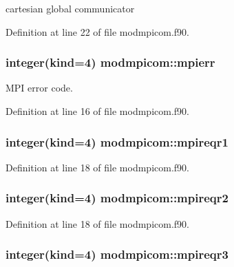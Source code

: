 cartesian global communicator 



Definition at line 22 of file modmpicom.\+f90.

\subsubsection[{\texorpdfstring{mpierr}{mpierr}}]{\setlength{\rightskip}{0pt plus 5cm}integer(kind=4) modmpicom\+::mpierr}\hypertarget{namespacemodmpicom_a500c48035640d6e5b49b1b694372bcd3}{}\label{namespacemodmpicom_a500c48035640d6e5b49b1b694372bcd3}


M\+PI error code. 



Definition at line 16 of file modmpicom.\+f90.

\subsubsection[{\texorpdfstring{mpireqr1}{mpireqr1}}]{\setlength{\rightskip}{0pt plus 5cm}integer(kind=4) modmpicom\+::mpireqr1}\hypertarget{namespacemodmpicom_ac22bfba3e611102e10fdfd1de038f25f}{}\label{namespacemodmpicom_ac22bfba3e611102e10fdfd1de038f25f}


Definition at line 18 of file modmpicom.\+f90.

\subsubsection[{\texorpdfstring{mpireqr2}{mpireqr2}}]{\setlength{\rightskip}{0pt plus 5cm}integer(kind=4) modmpicom\+::mpireqr2}\hypertarget{namespacemodmpicom_a825f1ba2f76e8ca1c71b11f4e7b29815}{}\label{namespacemodmpicom_a825f1ba2f76e8ca1c71b11f4e7b29815}


Definition at line 18 of file modmpicom.\+f90.

\subsubsection[{\texorpdfstring{mpireqr3}{mpireqr3}}]{\setlength{\rightskip}{0pt plus 5cm}integer(kind=4) modmpicom\+::mpireqr3}\hypertarget{namespacemodmpicom_a3d9bf986389786c043540894df1ad003}{}\label{namespacemodmpicom_a3d9bf986389786c043540894df1ad003}



